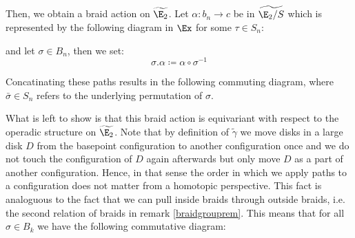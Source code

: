 \begin{const}
Then, we obtain a braid action on $\widetilde{\E_2}$.
Let $\alpha \colon b_n \to c$ be in $\widetilde{\E_2 \slash S}$ which is represented 
by the following diagram in $\Ex$ for some $\tau \in S_n$:

\begin{center}
\end{center}

and let $\sigma \in B_n$, then we set:
\[
    \sigma . \alpha \coloneq \alpha \circ \sigma^{-1}
\]

Concatinating these paths results in the following commuting diagram, where $\bar{\sigma} \in S_n$ refers to 
the underlying permutation of $\sigma$.

\begin{center}
\end{center}

What is left to show is that this braid action is equivariant with respect to the operadic
structure on $\widetilde{\E_2}$. Note that by definition of $\widetilde{\gamma}$ we move
disks in a large disk $D$ from the basepoint configuration to another configuration
once and we do not touch the configuration of $D$ again afterwards but only move $D$
as a part of another configuration. Hence, in that sense the order in which we apply 
paths to a configuration does not matter from a homotopic perspective.
This fact is analoguous to the fact that we can pull inside braids through 
outside braids, i.e. the second relation of braids in remark \ref{braidgrouprem}.
This means that for all $\sigma \in B_k$ we have the following commutative diagram:


\end{const}
